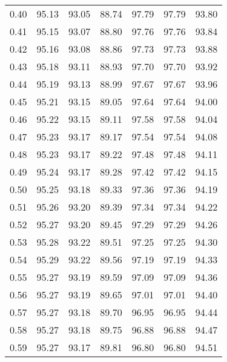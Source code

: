 \begin{tabular}{|c|c|c|c|c|c|c|}
      0.40 &     95.13 &     93.05 &      88.74 &   97.79 &      97.79 &         93.80 \\
      0.41 &     95.15 &     93.07 &      88.80 &   97.76 &      97.76 &         93.84 \\
      0.42 &     95.16 &     93.08 &      88.86 &   97.73 &      97.73 &         93.88 \\
      0.43 &     95.18 &     93.11 &      88.93 &   97.70 &      97.70 &         93.92 \\
      0.44 &     95.19 &     93.13 &      88.99 &   97.67 &      97.67 &         93.96 \\
      0.45 &     95.21 &     93.15 &      89.05 &   97.64 &      97.64 &         94.00 \\
      0.46 &     95.22 &     93.15 &      89.11 &   97.58 &      97.58 &         94.04 \\
      0.47 &     95.23 &     93.17 &      89.17 &   97.54 &      97.54 &         94.08 \\
      0.48 &     95.23 &     93.17 &      89.22 &   97.48 &      97.48 &         94.11 \\
      0.49 &     95.24 &     93.17 &      89.28 &   97.42 &      97.42 &         94.15 \\
      0.50 &     95.25 &     93.18 &      89.33 &   97.36 &      97.36 &         94.19 \\
      0.51 &     95.26 &     93.20 &      89.39 &   97.34 &      97.34 &         94.22 \\
      0.52 &     95.27 &     93.20 &      89.45 &   97.29 &      97.29 &         94.26 \\
      0.53 &     95.28 &     93.22 &      89.51 &   97.25 &      97.25 &         94.30 \\
      0.54 &     95.29 &     93.22 &      89.56 &   97.19 &      97.19 &         94.33 \\
      0.55 &     95.27 &     93.19 &      89.59 &   97.09 &      97.09 &         94.36 \\
      0.56 &     95.27 &     93.19 &      89.65 &   97.01 &      97.01 &         94.40 \\
      0.57 &     95.27 &     93.18 &      89.70 &   96.95 &      96.95 &         94.44 \\
      0.58 &     95.27 &     93.18 &      89.75 &   96.88 &      96.88 &         94.47 \\
      0.59 &     95.27 &     93.17 &      89.81 &   96.80 &      96.80 &         94.51 \\

\end{tabular}
